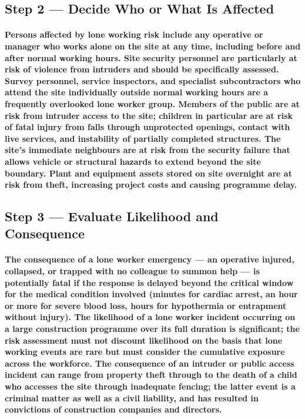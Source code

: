 \subsection{Step 2 --- Decide Who or What Is Affected}
\paragraph{Persons affected by lone working risk include any operative or manager who works alone on the site at any time, including before and after normal working hours. Site security personnel are particularly at risk of violence from intruders and should be specifically assessed. Survey personnel, service inspectors, and specialist subcontractors who attend the site individually outside normal working hours are a frequently overlooked lone worker group. Members of the public are at risk from intruder access to the site; children in particular are at risk of fatal injury from falls through unprotected openings, contact with live services, and instability of partially completed structures. The site's immediate neighbours are at risk from the security failure that allows vehicle or structural hazards to extend beyond the site boundary. Plant and equipment assets stored on site overnight are at risk from theft, increasing project costs and causing programme delay.}

\subsection{Step 3 --- Evaluate Likelihood and Consequence}
\paragraph{The consequence of a lone worker emergency --- an operative injured, collapsed, or trapped with no colleague to summon help --- is potentially fatal if the response is delayed beyond the critical window for the medical condition involved (minutes for cardiac arrest, an hour or more for severe blood loss, hours for hypothermia or entrapment without injury). The likelihood of a lone worker incident occurring on a large construction programme over its full duration is significant; the risk assessment must not discount likelihood on the basis that lone working events are rare but must consider the cumulative exposure across the workforce. The consequence of an intruder or public access incident can range from property theft through to the death of a child who accesses the site through inadequate fencing; the latter event is a criminal matter as well as a civil liability, and has resulted in convictions of construction companies and directors.}

